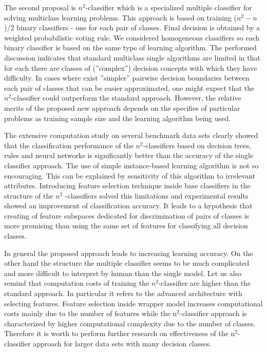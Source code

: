 \documentclass{article}
\begin{document}
The second proposal is $n^{2}$-classifier which is a specialized
multiple classifier for solving multiclass learning problems. This
approach is based on training ($n^{2}-n$)/2 binary classifiers -
one for each pair of classes. Final decision is obtained by a
weighted probabilistic voting rule. We considered homogeneous
classifiers so each binary classifier is based on the same type of
learning algorithm. The performed discussion indicates that
standard multiclass single algorithms are limited in that for each
there are classes of (''complex'') decision concepts with which
they have difficulty. In cases where exist ''simpler'' pairwise
decision boundaries between each pair of classes that can be
easier approximated, one might expect that the $n^2$-classifier
could outperform the standard approach. However, the relative
merits of the proposed new approach depends on the specifies of
particular problems as training sample size and the learning
algorithm being used.

The extensive computation study on several benchmark data sets
clearly showed that the classification performance of the
$n^{2}$-classifiers based on decision trees, rules and neural
networks is significantly better than the accuracy of the single
classifier approach. The use of simple instance-based learning
algorithm is not so encouraging. This can be explained by
sensitivity of this algorithm to irrelevant attributes.
Introducing feature
selection technique inside base classifiers in the structure of the $n^{2}$%
-classifiers solved this limitations and experimental results
showed an improvement of classification accuracy. It leads to a
hypothesis that creating of feature subspaces dedicated for
discrimination of pairs of classes is more promising than using
the same set of features for classifying all decision classes.

In general the proposed approach leads to increasing learning
accuracy. On the other hand the structure the multiple classifier
seems to be much complicated and more difficult to interpret by
human than the single model. Let us also remind that computation
costs of training the $n^2$-classifier are higher than the
standard approach. In particular it refers to the advanced
architecture with selecting features. Feature selection inside
wrapper model increases computational costs mainly due to the
number of features while the n$^2$-classifier approach is
characterized by higher computational complexity due to the number
of classes. Therefore it is worth to perform further research on
effectiveness of the n$^2$-classifier approach for larger data
sets with many decision classes.
\end{document}
